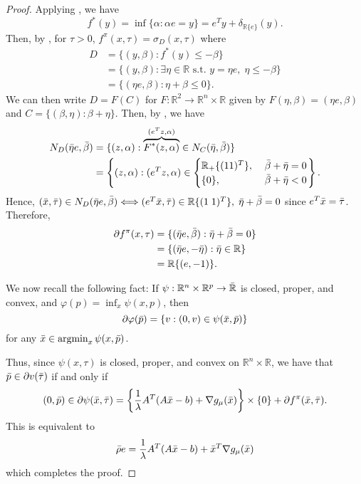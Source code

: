\documentclass[10pt,a4paper]{article}
\numberwithin{equation}{section}
\theoremstyle{definition}
\def\rr{{\mathbb R}}
\DeclareMathOperator{\argmin}{argmin}
\begin{document}
\begin{proof}
    Applying \cite[Theorem 16.3]{rockafellar-1970}, we have
    \[
    f^\ast(y) = \inf \{ \alpha : \alpha e = y \} = e^Ty + \delta_{\rr \{e\}}(y).
    \]
    Then, by \cite[Corollary 13.5.1]{rockafellar-1970}, for $\tau > 0$, $f^{\pi}(x, \tau) = \sigma_D(x, \tau)$ where
    \begin{align*}
        D &= \{(y, \beta): f^\ast(y) \leq - \beta \} \\
            &= \{(y, \beta): \exists \eta \in \rr \text{ s.t. } y = \eta e, \; \eta \leq - \beta \} \\
            &= \{(\eta e, \beta): \eta + \beta \leq 0 \}.
    \end{align*}
    We can then write $D = F(C)$ for $F: \rr^2 \to \rr^n \times \rr$ given by $F(\eta, \beta) = (\eta e, \beta)$ and $C = \{(\beta, \eta) : \beta + \eta \}$. Then, by \cite[Theorem 6.4.3]{RockWets98}, we have
    \begin{align*}
        N_D(\Bar{\eta}e, \Bar{\beta}) &= \{(z, \alpha) : \overbrace{F^\ast(z, \alpha)}^{(e^Tz, \alpha)} \in N_C(\Bar{\eta}, \Bar{\beta}) \} \\ &= \left\{ (z, \alpha) : (e^Tz, \alpha) \in 
        \begin{cases}
            \rr_+\{(1 1)^T\}, &\; \Bar{\beta} + \bar{\eta} = 0 \\ \{0\}, &\; \Bar{\beta} + \bar{\eta} < 0 
        \end{cases} \right\}.
    \end{align*}
    Hence, $(\Bar{x}, \Bar{\tau}) \in N_D(\Bar{\eta}e, \Bar{\beta}) \Longleftrightarrow (e^T\Bar{x}, \Bar{\tau}) \in \rr \{(1 \; 1)^T\}, \; \Bar{\eta} + \Bar{\beta} = 0$ since $e^T\Bar{x} = \Bar{\tau}$. Therefore, 
    \begin{align*}
         \partial f^\pi(x, \tau) &= \{(\Bar{\eta}e, \Bar{\beta}) :  \Bar{\eta} + \Bar{\beta} = 0 \} \\
         &= \{(\Bar{\eta}e, -\Bar{\eta}) :  \Bar{\eta} \in \rr \} \\
         &= \rr \{(e, -1)\}.
    \end{align*}

    We now recall the following fact: If $\psi: \rr^n \times \rr^p \to \Bar{\rr}$ is closed, proper, and convex, and $\varphi(p) = \inf_x \psi(x,p)$, then 
    \[
    \partial \varphi (\Bar{p}) = \{v: (0,v) \in \psi(\Bar{x}, \Bar{p}) \}
    \]
    for any $\Bar{x} \in \argmin_x \psi(x, \Bar{p})$.

    Thus, since $\psi(x, \tau)$ is closed, proper, and convex on $\rr^n \times \rr$, we have that $\Bar{p} \in \partial v(\Bar{\tau})$ if and only if 
    \[
    (0, \Bar{p}) \in \partial \psi(\Bar{x}, \Bar{\tau}) = \left\{ \frac{1}{\lambda}A^T(A\Bar{x}-b) + \nabla g_\mu(\Bar{x}) \right\} \times \{0\} + \partial f^\pi(\Bar{x}, \Bar{\tau}).
    \]
    This is equivalent to
    \[
     \Bar{\rho} e = \frac{1}{\lambda}A^T(A\Bar{x}-b) + \Bar{x}^T \nabla g_{\mu}(\Bar{x})
    \]
    which completes the proof.
\end{proof}
\end{document}
